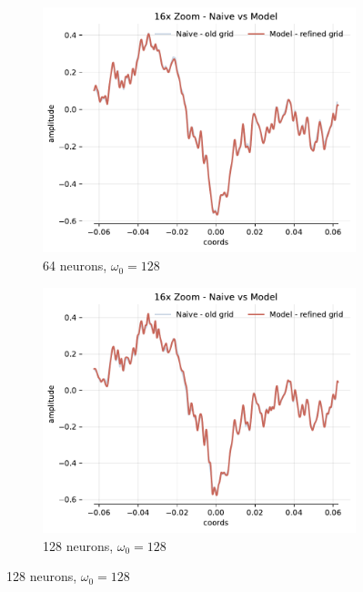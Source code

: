 \begin{figure}[h]
    \centering
    \begin{subfigure}[b]{0.32\textwidth}
        \centering
        \includegraphics[width=\textwidth]{img/ch3/16x-zoom-1hl-64hf-128hz.pdf}
        \caption{64 neurons, $\omega_0=128$}
        \label{fig:16x-zoom-1hl-64hf-128hz}
    \end{subfigure}
    \begin{subfigure}[b]{0.32\textwidth}
        \centering
        \includegraphics[width=\textwidth]{img/ch3/16x-zoom-1hl-128hf-128hz.pdf}
        \caption{128 neurons, $\omega_0=128$}
        \label{fig:16x-zoom-1hl-128hf-128hz}

\end{subfigure}
\end{figure}
